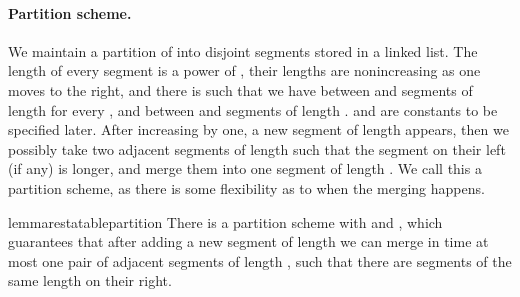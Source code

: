 \documentclass{article}[11pt,letter]
\begin{document}
\paragraph{Partition scheme.} We maintain a partition of  into disjoint segments stored in a linked list.
The length of every segment is a power of , their lengths are nonincreasing as one moves to the right, and there is 
such that we
have between  and  segments of length  for every , and between  and  segments of
length .  and  are constants to be specified later. After increasing  by one, a new segment of
length  appears, then we possibly take two adjacent segments of length  such that the
segment on their left (if any) is longer, and merge them into one segment of length . We call this a partition scheme, as there is some
flexibility as to when the merging happens.

\begin{restatable}{lemma}{restatablepartition}
\label{lemma:partition}
There is a partition scheme with  and , which guarantees that after adding a new segment of length  we can
merge in  time at most one pair of adjacent segments of length , such that there are  segments
of the same length  on their right.
\end{restatable}
\end{document}
